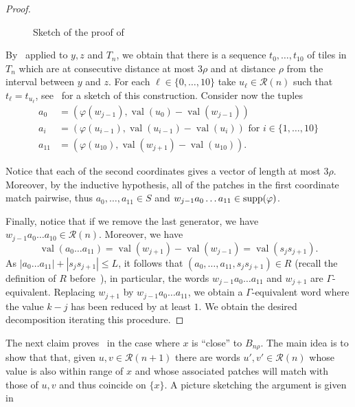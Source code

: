 \documentclass{article}
\theoremstyle{definition}
\theoremstyle{definition}
\newcommand{\val}{\operatorname{val}}
\newcommand{\supp}{\textnormal{supp}}
\begin{document}
\begin{proof}
\begin{figure}[h!]
\begin{tikzpicture}
        \end{tikzpicture}
        \caption{Sketch of the proof of~}
        \label{fig:proof_forma_canonica}
    \end{figure}
        
        By~ applied to $y,z$ and $T_n$, we obtain that there is a sequence $t_0,\dots,t_{10}$ of tiles in $T_n$ which are at consecutive distance at most $3\rho$ and at distance $\rho$ from the interval between $y$ and $z$. For each $\ell \in \{0,\dots,10\}$ take $u_{\ell}\in \mathcal{R}(n)$ such that $t_{\ell}=t_{u_{\ell}}$, see~ for a sketch of this construction. Consider now the tuples 
        \begin{align*}
            a_0 &  = (\varphi(w_{j-1}), \val(u_0) -\val(w_{j-1}))\\
            a_i & = (\varphi(u_{i-1}),\val(u_{i-1})-\val(u_i)) \mbox{ for } i \in \{1,\dots,10\}\\
            a_{11} & = (\varphi(u_{10}),\val(w_{j+1})-\val(u_{10})).
        \end{align*}

        Notice that each of the second coordinates gives a vector of length at most $3\rho$. Moreover, by the inductive hypothesis, all of the patches in the first coordinate match pairwise, thus $a_0,\dots,a_{11} \in S$ and  $w_{j-1}a_0\dots a_{11} \in \supp(\varphi)$.
        
        Finally, notice that if we remove the last generator, we have $w_{j-1}a_0\dots a_{10} \in \mathcal{R}(n)$. Moreover, we have \[\val(a_0\dots a_{11}) = \val(w_{j+1})-\val(w_{j-1}) =\val(s_js_{j+1}).\]
        As $|a_0\dots a_{11}| + |s_js_{j+1}|\leq L$, it follows that $(a_0,\dots, a_{11},s_js_{j+1}) \in R$ (recall the definition of $R$ before~), in particular, the words $w_{j-1}a_0\dots a_{11}$ and $w_{j+1}$ are $\Gamma$-equivalent. Replacing $w_{j+1}$ by $w_{j-1}a_0\dots a_{11}$, we obtain a $\Gamma$-equivalent word where the value $k-j$ has been reduced by at least $1$. We obtain the desired decomposition iterating this procedure.
    \end{proof}

   

    The next claim proves~ in the case where $x$ is ``close'' to $B_{n\rho}$. The main idea is to show that that, given $u,v \in \mathcal{R}(n+1)$ there are words $u',v'\in \mathcal{R}(n)$ whose value is also within range of $x$ and whose associated patches will match with those of $u,v$ and thus coincide on $\{x\}$. A picture sketching the argument is given in~
\end{document}
